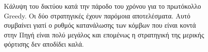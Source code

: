 \begin{figure}[H]
  \centering
  \caption{Κάλυψη του δικτύου κατά την πάροδο του χρόνου για το πρωτόκολλο Greedy. Οι δύο στρατηγικές έχουν παρόμοια αποτελέσματα. Αυτό
συμβαίνει γιατί ο ρυθμός κατανάλωσης των κόμβων που είναι κοντά στην Πηγή είναι πολύ μεγάλος και επομένως η στρατηγική της μερικής φόρτισης δεν αποδίδει καλά.}
  \label{fig:5_2exp_3_1}
\end{figure}


